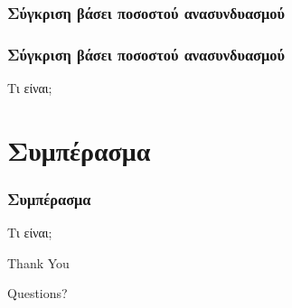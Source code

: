 \documentclass[xetex,mathserif,serif,14pt]{beamer}
\begin{document}
\subsubsection{Σύγκριση βάσει ποσοστού ανασυνδυασμού}

\begin{frame}
\frametitle{Σύγκριση βάσει ποσοστού ανασυνδυασμού}
Τι είναι;
\end{frame}

\section{Συμπέρασμα}

\begin{frame}
\frametitle{Συμπέρασμα}
Τι είναι;
\end{frame}


\begin{frame}

\Huge{\centerline{Thank You}}
\Large{\centerline{Questions?}}
\end{frame}

\end{document}

